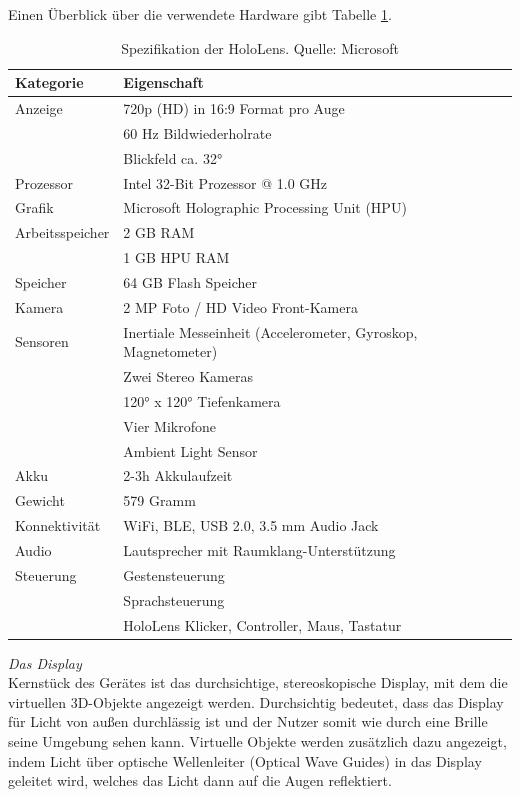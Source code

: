 Einen Überblick über die verwendete Hardware gibt Tabelle \ref{tab:hololens_tech_details}.

\bgroup
\setlength\extrarowheight{0pt}
\def\arraystretch{1.25}
\begin{table}[H]
	\centering
	\begin{tabular}{l|l}
		Kategorie & Eigenschaft\\
		\hline
		\hline
		Anzeige & 720p (HD) in 16:9 Format pro Auge\\
		& 60 Hz Bildwiederholrate\\
		& Blickfeld ca. 32°\\
		\hline
		Prozessor & Intel 32-Bit Prozessor @ 1.0 GHz\\
		\hline
		Grafik & Microsoft Holographic Processing Unit (HPU)\\
		\hline
		Arbeitsspeicher & 2 GB RAM\\
		& 1 GB HPU RAM\\
		\hline
		Speicher & 64 GB Flash Speicher\\
		\hline
		Kamera & 2 MP Foto / HD Video Front-Kamera\\
		\hline
		Sensoren & Inertiale Messeinheit (Accelerometer, Gyroskop, Magnetometer) \\
		& Zwei Stereo Kameras\\
		& 120° x 120° Tiefenkamera\\
		& Vier Mikrofone\\
		& Ambient Light Sensor\\
		\hline
		Akku & 2-3h Akkulaufzeit \\
		\hline
		Gewicht & 579 Gramm \\
		\hline
		Konnektivität & WiFi, BLE, USB 2.0, 3.5 mm Audio Jack \\
		\hline
		Audio & Lautsprecher mit Raumklang-Unterstützung\\
		\hline
		Steuerung & Gestensteuerung\\
		& Sprachsteuerung\\
		& HoloLens Klicker, Controller, Maus, Tastatur\\
	\end{tabular}\caption{\label{tab:hololens_tech_details} Spezifikation der HoloLens. Quelle: Microsoft}
\end{table}
\egroup

\vspace{4px}
\textit{Das Display}\\
Kernstück des Gerätes ist das durchsichtige, stereoskopische Display, mit dem die virtuellen 3D-Objekte angezeigt werden. Durchsichtig bedeutet, dass das Display für Licht von außen durchlässig ist und der Nutzer somit wie durch eine Brille seine Umgebung sehen kann. Virtuelle Objekte werden zusätzlich dazu angezeigt, indem Licht über optische Wellenleiter (Optical Wave Guides) in das Display geleitet wird, welches das Licht dann auf die Augen reflektiert.\\

